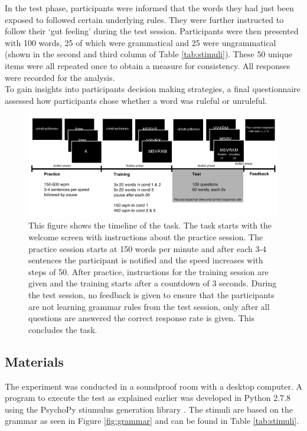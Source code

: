In the test phase, participants were informed that the words they had just been exposed to followed certain underlying rules. They were further instructed to follow their `gut feeling' during the test session. Participants were then presented with 100 words, 25 of which were grammatical and 25 were ungrammatical (shown in the second and third column of Table \ref{tab:stimuli}). These 50 unique items were all repeated once to obtain a measure for consistency. All responses were recorded for the analysis.\\
To gain insights into participants decision making strategies, a final questionnaire assessed how participants chose whether a word was ruleful or unruleful. 
\begin{figure}[h]
	\centering
	\includegraphics[width=\textwidth]{media/tasktimeline}
	\caption{This figure shows the timeline of the task. The task starts with the welcome screen with instructions about the practice session. The practice session starts at 150 words per minute and after each 3-4 sentences the participant is notified and the speed increases with steps of 50. After practice, instructions for the training session are given and the training starts after a countdown of 3 seconds. During the test session, no feedback is given to ensure that the participants are not learning grammar rules from the test session, only after all questions are answered the correct response rate is given. This concludes the task.}
	\label{fig:tasktimeline}
\end{figure}

\subsection{Materials}
The experiment was conducted in a soundproof room with a desktop computer. A program to execute the test as explained earlier was developed in Python 2.7.8 using the PsychoPy stiumulus generation library \citep{peirce2008generating}. The stimuli are based on the grammar as seen in Figure \ref{fig:grammar} and can be found in Table \ref{tab:stimuli}.

